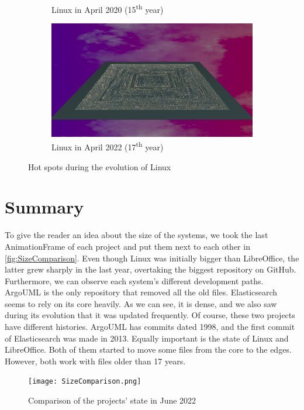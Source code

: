 \begin{figure}[ht]
\begin{subfigure}{0.48\textwidth}
        \caption{Linux in April 2020 (15\textsuperscript{th} year)} 
        \label{fig:Linux_V7_S5}
    \end{subfigure}\hspace*{\fill}
    \begin{subfigure}{0.48\textwidth}
        \includegraphics[width=\linewidth]{Linux/Animation017.png}
        \caption{Linux in April 2022 (17\textsuperscript{th} year)} 
        \label{fig:Linux_V7_S6}
    \end{subfigure}
    
    \caption{Hot spots during the evolution of Linux} 
    \label{fig:Linux_V7}
\end{figure}

\clearpage
\section{Summary}

To give the reader an idea about the size of the systems, we took the last AnimationFrame of each project and put them next to each other in \autoref{fig:SizeComparison}. Even though Linux was initially bigger than LibreOffice, the latter grew sharply in the last year, overtaking the biggest repository on GitHub. Furthermore, we can observe each system's different development paths. ArgoUML is the only repository that removed all the old files. Elasticsearch seems to rely on its core heavily. As we can see, it is dense, and we also saw during its evolution that it was updated frequently. Of course, these two projects have different histories. ArgoUML has commits dated 1998, and the first commit of Elasticsearch was made in 2013. Equally important is the state of Linux and LibreOffice. Both of them started to move some files from the core to the edges. However, both work with files older than 17 years. 

\begin{figure}[ht]
    \centering
    \texttt{[image: SizeComparison.png]}
    \caption{Comparison of the projects' state in June 2022} 
    \label{fig:SizeComparison}
\end{figure}
